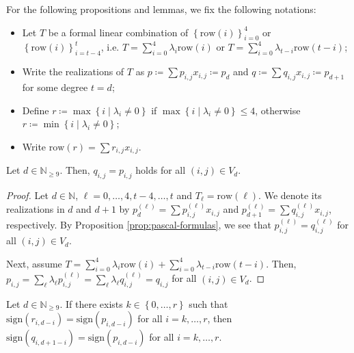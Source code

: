 For the following propositions and lemmas, we fix the following notations:
\begin{itemize}
    \item Let \( T \) be a formal linear combination of \( \left\{ \mathrm{row}(i) \right\}_{i=0}^4 \) or \( \left\{ \mathrm{row}(i) \right\}_{i=t-4}^t \), i.e. \( T = \sum_{i=0}^{4}  \lambda_{i} \mathrm{row}(i)  \) or \( T = \sum_{i=0}^{4}  \lambda_{t-i} \mathrm{row}(t-i) \);
    \item Write the realizations of \( T \) as \( p \coloneqq \sum p_{i,j}x_{i,j}  \coloneqq p_d  \) and \( q \coloneqq \sum q_{i,j}x_{i,j} \coloneqq p_{d+1} \) for some degree \( t = d \);
    \item Define \( r \coloneqq \max\left\{ i \mid \lambda_i \neq 0 \right\} \) if \(  \max\left\{ i \mid \lambda_i \neq 0 \right\} \leq 4 \), otherwise \( r \coloneqq \min\left\{ i \mid \lambda_i \neq 0 \right\} \); 
    \item Write \( \mathrm{row}(r) = \sum r_{i,j}x_{i,j} \).
\end{itemize}  

\begin{lemma}\label{prop:row_extend_d}
    Let \( d \in \mathbb{N}_{\geq 9} \). Then, \( q_{i,j} = p_{i,j} \) holds for all \( (i,j) \in V_d \).
\end{lemma}
  
\begin{proof}
    Let \( d \in \mathbb{N} \), \( \ell = 0, \dots, 4,t-4,\dots,t \) and \(T_{\ell} =  \mathrm{row}(\ell) \). We denote its realizations in \( d \) and \( d + 1 \) by \( p_d^{(\ell)} = \sum p_{i,j}^{(\ell)}x_{i,j} \) and \( p_{d+1}^{(\ell)} = \sum q_{i,j}^{(\ell)}x_{i,j} \), respectively. By Proposition \ref{prop:pascal-formulas}, we see that \( p_{i,j}^{(\ell)} = q_{i,j}^{(\ell)} \) for all \( (i,j) \in V_d \).
    
    Next, assume \( T =  \sum_{i=0}^{4}  \lambda_{i} \mathrm{row}(i) + \sum_{i=0}^{4}  \lambda_{t-i} \mathrm{row}(t-i)  \). Then, \( p_{i,j} = \sum_{\ell} \lambda_\ell p_{i,j}^{(\ell)} = \sum_{\ell} \lambda_\ell q_{i,j}^{(\ell)} = q_{i,j} \) for all \( (i,j) \in V_d \).
\end{proof}
  
  
\begin{lemma}\label{lemma:sign_row_propagation}
    Let \( d \in \mathbb{N}_{\geq 9} \). If there exists \( k \in \left\{ 0, \dots, r \right\} \) such that $\mathrm{sign}(r_{i,d-i}) = \mathrm{sign}(p_{i,d-i})$ for all \( i = k, \dots, r \), then \( \mathrm{sign}(q_{i,d+1-i}) = \mathrm{sign}(p_{i,d-i}) \) for all \( i = k, \dots, r\).
\end{lemma}

